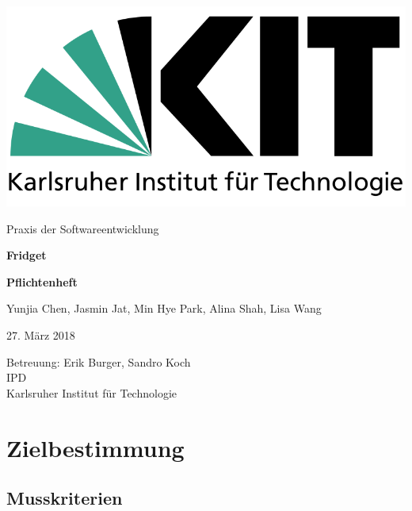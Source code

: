 \documentclass[a4paper]{scrreprt}
\begin{document}
    \begin{flushright}
        \includegraphics[scale = 0.2]{kit-logo.png}\\[0.5cm]
    \end{flushright}
    \vspace*{2cm}

    \begin{center} 
    		\large Praxis der Softwareentwicklung
        \vspace*{1.5cm}

        \textbf{\huge Fridget}
        \vspace*{1cm}

        \textbf{\Large Pflichtenheft}
        \vspace*{2cm}

        Yunjia Chen, Jasmin Jat, Min Hye Park, Alina Shah, Lisa Wang
        \vspace*{1cm}

        27. März 2018
        \vspace*{2.5cm}

        Betreuung: Erik Burger, Sandro Koch\\[0.5cm]
        IPD\\[0.5cm]

        Karlsruher Institut für Technologie
    \end{center}
    \thispagestyle{empty}

    \tableofcontents

    \chapter{Zielbestimmung}
        \section{Musskriterien}
\end{document}
